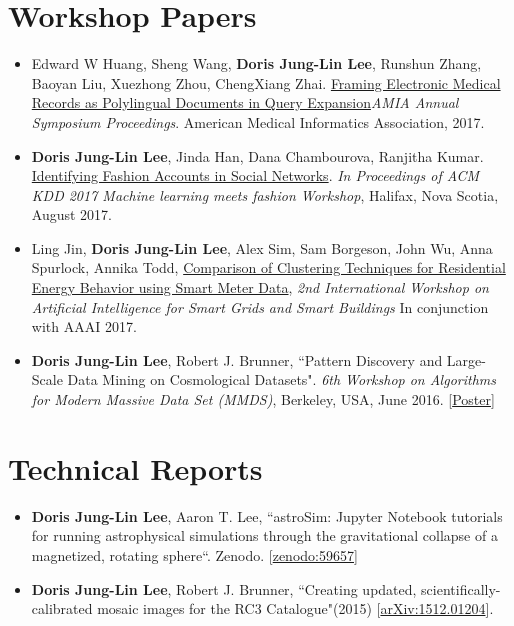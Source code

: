 \documentclass{res}
\begin{document}
\begin{resume}
\section{Workshop Papers}
\begin{itemize}
\item Edward W Huang, Sheng Wang, \textbf{Doris Jung-Lin Lee}, Runshun Zhang, Baoyan Liu, Xuezhong Zhou, ChengXiang Zhai. \href{https://amia2017.zerista.com/event/member/389402}{Framing Electronic Medical Records as Polylingual Documents in Query Expansion}\textit{AMIA Annual Symposium Proceedings}. American Medical Informatics Association, 2017.
\item \textbf{Doris Jung-Lin Lee}, Jinda Han, Dana Chambourova, Ranjitha Kumar. \href{https://kddfashion2017.mybluemix.net/final_submissions/ML4Fashion_paper_21.pdf}{Identifying Fashion Accounts in Social Networks}.  \textit{In Proceedings of ACM KDD 2017 Machine learning meets fashion Workshop}, Halifax, Nova Scotia, August 2017.
\item Ling Jin, \textbf{Doris Jung-Lin Lee}, Alex Sim, Sam Borgeson, John Wu, Anna Spurlock, Annika Todd, \href{https://sdm.lbl.gov/perf/AISGSB2017-final2.pdf}{Comparison of Clustering Techniques for Residential Energy Behavior using Smart Meter Data}, \textit{2nd International Workshop on Artificial Intelligence for Smart Grids and Smart Buildings} In conjunction with AAAI 2017.
\item \textbf{Doris Jung-Lin Lee}, Robert J. Brunner, ``Pattern Discovery and Large-Scale Data Mining on Cosmological Datasets". \textit{6th Workshop on Algorithms for Modern Massive Data Set (MMDS)}, Berkeley, USA, June 2016.  [\href{http://dorisjunglinlee.com/files/MMDS_poster.pdf}{Poster}]
\end{itemize}
\vspace{-10pt}
\section{Technical Reports}
\begin{itemize}
\item \textbf{Doris Jung-Lin Lee}, Aaron T. Lee, ``astroSim: Jupyter Notebook tutorials for running astrophysical simulations through the gravitational collapse of a magnetized, rotating sphere``. Zenodo. [\href{http://doi.org/10.5281/zenodo.59657}{zenodo:59657}]
\item \textbf{Doris Jung-Lin Lee}, Robert J. Brunner, ``Creating updated, scientifically-calibrated mosaic images for the RC3 Catalogue"(2015) [\href{http://arxiv.org/abs/1512.01204}{arXiv:1512.01204}]. 
\end{itemize}

\end{resume}
\end{document}
